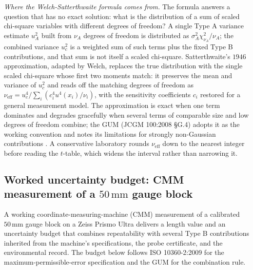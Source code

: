 \begin{mastery}
\textit{Where the Welch-Satterthwaite formula comes from.} The
formula answers a question that has no exact solution: what is the
distribution of a sum of scaled chi-square variables with different
degrees of freedom? A single Type A variance estimate $u_{A}^{2}$
built from $\nu_{A}$ degrees of freedom is distributed as
$\sigma_{A}^{2} \chi^{2}_{\nu_{A}}/\nu_{A}$; the combined variance
$u_{c}^{2}$ is a weighted sum of such terms plus the fixed Type B
contributions, and that sum is not itself a scaled chi-square.
Satterthwaite's $1946$ approximation, adapted by Welch, replaces the
true distribution with the single scaled chi-square whose first two
moments match: it preserves the mean and variance of $u_{c}^{2}$ and
reads off the matching degrees of freedom as $\nu_{\text{eff}} =
u_{c}^{4}/\sum_{i} (c_{i}^{4} u^{4}(x_{i})/\nu_{i})$, with the
sensitivity coefficients $c_{i}$ restored for a general measurement
model. The approximation is exact when one term dominates and
degrades gracefully when several terms of comparable size and low
degrees of freedom combine; the GUM (JCGM 100:2008 \S G.4) adopts it
as the working convention and notes its limitations for strongly
non-Gaussian contributions \cite{std:iso-iec-guide98}. A conservative
laboratory rounds $\nu_{\text{eff}}$ down to the nearest integer
before reading the $t$-table, which widens the interval rather than
narrowing it.
\end{mastery}

\subsection{Worked uncertainty budget: CMM measurement of a
$50\,\si{\milli\meter}$ gauge block}

A working coordinate-measuring-machine (CMM) measurement of a
calibrated $50\,\si{\milli\meter}$ gauge block on a Zeiss
Prismo Ultra delivers a length value and an uncertainty budget
that combines repeatability with several Type B contributions
inherited from the machine's specifications, the probe
certificate, and the environmental record. The budget below
follows ISO 10360-2:2009 \cite{std:iso-10360-2} for the
maximum-permissible-error specification and the GUM
\cite{std:iso-iec-guide98} for the combination rule.

